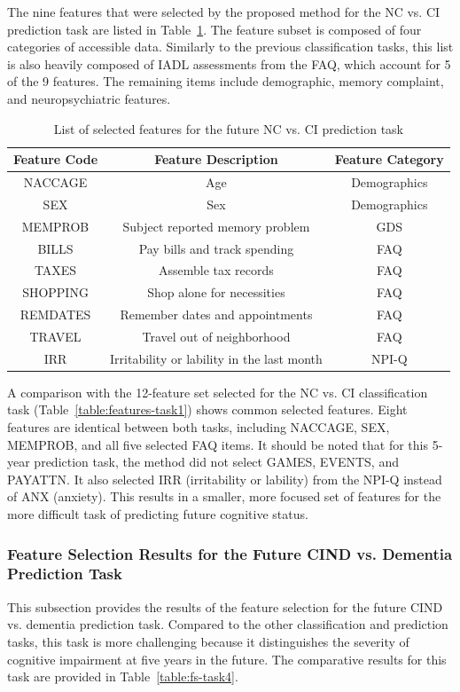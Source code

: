 The nine features that were selected by the proposed method for the NC vs. CI prediction task are listed in Table~\ref{table:features-task3}. The feature subset is composed of four categories of accessible data. Similarly to the previous classification tasks, this list is also heavily composed of IADL assessments from the FAQ, which account for 5 of the 9 features. The remaining items include demographic, memory complaint, and neuropsychiatric features. 

\begin{table}[h!]
\centering
\caption{List of selected features for the future NC vs. CI prediction task}
\label{table:features-task3}
\begin{tabular}{ccc}
\toprule
\textbf{Feature Code} & \textbf{Feature Description} & \textbf{Feature Category} \\
\midrule
NACCAGE & Age & Demographics \\
SEX & Sex & Demographics \\
MEMPROB & Subject reported memory problem & GDS \\
BILLS & Pay bills and track spending & FAQ \\
TAXES & Assemble tax records & FAQ \\
SHOPPING & Shop alone for necessities & FAQ \\
REMDATES & Remember dates and appointments & FAQ \\
TRAVEL & Travel out of neighborhood & FAQ \\
IRR & Irritability or lability in the last month & NPI-Q \\
\bottomrule
\end{tabular}
\end{table}

A comparison with the 12-feature set selected for the NC vs. CI classification task (Table~\ref{table:features-task1}) shows common selected features. Eight features are identical between both tasks, including NACCAGE, SEX, MEMPROB, and all five selected FAQ items. It should be noted that for this 5-year prediction task, the method did not select GAMES, EVENTS, and PAYATTN. It also selected IRR (irritability or lability) from the NPI-Q instead of ANX (anxiety). This results in a smaller, more focused set of features for the more difficult task of predicting future cognitive status.

\subsubsection{Feature Selection Results for the Future CIND vs. Dementia Prediction Task}
This subsection provides the results of the feature selection for the future CIND vs. dementia prediction task. Compared to the other classification and prediction tasks, this task is more challenging because it distinguishes the severity of cognitive impairment at five years in the future. The comparative results for this task are provided in Table~\ref{table:fs-task4}.

